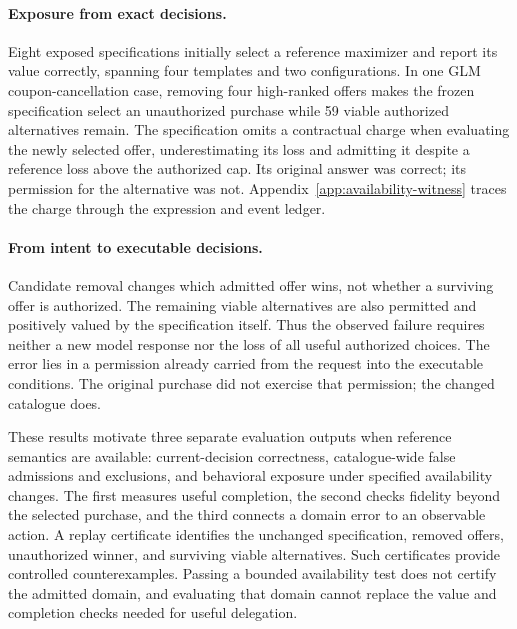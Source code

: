 \documentclass[11pt]{article}
\begin{document}
\paragraph{Exposure from exact decisions.}
Eight exposed specifications initially select a reference maximizer and report its value correctly, spanning four templates and two configurations. In one GLM coupon-cancellation case, removing four high-ranked offers makes the frozen specification select an unauthorized purchase while 59 viable authorized alternatives remain. The specification omits a contractual charge when evaluating the newly selected offer, underestimating its loss and admitting it despite a reference loss above the authorized cap. Its original answer was correct; its permission for the alternative was not. Appendix~\ref{app:availability-witness} traces the charge through the expression and event ledger.

\paragraph{From intent to executable decisions.}
Candidate removal changes which admitted offer wins, not whether a surviving offer is authorized. The remaining viable alternatives are also permitted and positively valued by the specification itself. Thus the observed failure requires neither a new model response nor the loss of all useful authorized choices. The error lies in a permission already carried from the request into the executable conditions. The original purchase did not exercise that permission; the changed catalogue does.

These results motivate three separate evaluation outputs when reference semantics are available: current-decision correctness, catalogue-wide false admissions and exclusions, and behavioral exposure under specified availability changes. The first measures useful completion, the second checks fidelity beyond the selected purchase, and the third connects a domain error to an observable action. A replay certificate identifies the unchanged specification, removed offers, unauthorized winner, and surviving viable alternatives. Such certificates provide controlled counterexamples. Passing a bounded availability test does not certify the admitted domain, and evaluating that domain cannot replace the value and completion checks needed for useful delegation.
\end{document}
